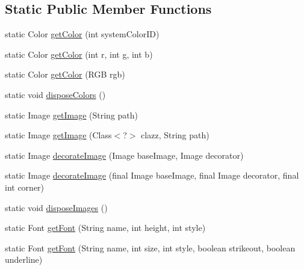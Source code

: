 \subsection*{Static Public Member Functions}
\begin{DoxyCompactItemize}
\item 
static Color \hyperlink{classorg_1_1eclipse_1_1wb_1_1swt_1_1_s_w_t_resource_manager_a261745b44e6e7846bd9b98c6777600eb}{get\-Color} (int system\-Color\-I\-D)
\item 
static Color \hyperlink{classorg_1_1eclipse_1_1wb_1_1swt_1_1_s_w_t_resource_manager_aff00c4c54fd3b52e1a283426162bcbeb}{get\-Color} (int r, int g, int b)
\item 
static Color \hyperlink{classorg_1_1eclipse_1_1wb_1_1swt_1_1_s_w_t_resource_manager_ab2f1aadf3dec4d4d37111193cb22071e}{get\-Color} (R\-G\-B rgb)
\item 
static void \hyperlink{classorg_1_1eclipse_1_1wb_1_1swt_1_1_s_w_t_resource_manager_aab5a68c84a6e2b80cd63013578bf6057}{dispose\-Colors} ()
\item 
static Image \hyperlink{classorg_1_1eclipse_1_1wb_1_1swt_1_1_s_w_t_resource_manager_a70b21c25bbe6f5d44e790612f3c9494e}{get\-Image} (String path)
\item 
static Image \hyperlink{classorg_1_1eclipse_1_1wb_1_1swt_1_1_s_w_t_resource_manager_a8b0695b71058d43c0bc3263a63640e11}{get\-Image} (Class$<$?$>$ clazz, String path)
\item 
static Image \hyperlink{classorg_1_1eclipse_1_1wb_1_1swt_1_1_s_w_t_resource_manager_a0d50f34419bd49f37f24b168fa486771}{decorate\-Image} (Image base\-Image, Image decorator)
\item 
static Image \hyperlink{classorg_1_1eclipse_1_1wb_1_1swt_1_1_s_w_t_resource_manager_a29903b99bec264ee2c58a85bd9611f19}{decorate\-Image} (final Image base\-Image, final Image decorator, final int corner)
\item 
static void \hyperlink{classorg_1_1eclipse_1_1wb_1_1swt_1_1_s_w_t_resource_manager_a10d60bcd9a8bbe25d9dbd0ef2c43b6b7}{dispose\-Images} ()
\item 
static Font \hyperlink{classorg_1_1eclipse_1_1wb_1_1swt_1_1_s_w_t_resource_manager_a0603188ae7ef4801932ec8090c31b51e}{get\-Font} (String name, int height, int style)
\item 
static Font \hyperlink{classorg_1_1eclipse_1_1wb_1_1swt_1_1_s_w_t_resource_manager_a6a2520a2bd310c970e4118e6d8dc5bf3}{get\-Font} (String name, int size, int style, boolean strikeout, boolean underline)
\item 

\end{DoxyCompactItemize}
